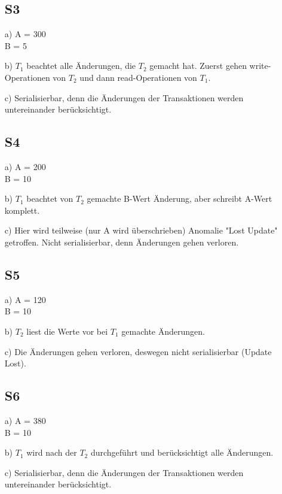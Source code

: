 \documentclass[a4paper,12pt]{scrartcl}
\begin{document}
\begin{enumerate}
\subsection*{S3}
	\item[a)]
	A = 300\\
	B = 5
	\item[b)]
	\(T_1\) beachtet alle Änderungen, die \(T_2\) gemacht hat. Zuerst gehen write-Operationen von \(T_2\) und dann read-Operationen von \(T_1\).
	\item[c)]
	Serialisierbar, denn die Änderungen der Transaktionen werden untereinander berücksichtigt.
	
\subsection*{S4}
	\item[a)]
	A = 200\\
	B = 10 
	\item[b)]
	\(T_1\) beachtet von \(T_2\) gemachte B-Wert Änderung, aber schreibt A-Wert komplett.
	\item[c)]
	Hier wird teilweise (nur A wird überschrieben) Anomalie "Lost Update" getroffen. Nicht serialisierbar, denn Änderungen gehen verloren.
	
\subsection*{S5}
	\item[a)]
	A = 120\\
	B = 10	
	\item[b)]
	\(T_2\) liest die Werte vor bei \(T_1\) gemachte Änderungen.  
	\item[c)]
	Die Änderungen gehen verloren, deswegen nicht serialisierbar (Update Lost).
		
\subsection*{S6}
	\item[a)]
	A = 380\\
	B = 10
	\item[b)]
	\(T_1\) wird nach der \(T_2\) durchgeführt und berücksichtigt alle Änderungen.
	\item[c)]
	Serialisierbar, denn die Änderungen der Transaktionen werden untereinander berücksichtigt.
	
\end{enumerate}
\end{document}
